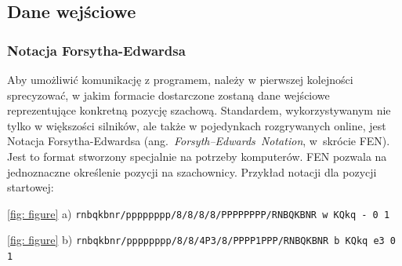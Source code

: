 \usepackage{biblatex}\subsection{Dane wejściowe}
\label{subsec:dane-wejsciowe}

\subsubsection{Notacja Forsytha-Edwardsa}

Aby umożliwić komunikację z programem, należy w pierwszej kolejności sprecyzować, w jakim formacie dostarczone zostaną dane wejściowe reprezentujące konkretną pozycję szachową.
Standardem, wykorzystywanym nie tylko w większości silników, ale także w pojedynkach rozgrywanych online, jest Notacja Forsytha-Edwardsa (ang.~\emph{Forsyth–Edwards~Notation}, w~skrócie FEN).
Jest to format stworzony specjalnie na potrzeby komputerów.
FEN pozwala na jednoznaczne określenie pozycji na szachownicy.
Przykład notacji dla pozycji startowej:

\vspace{5mm}
\centerline{
    \ref{fig: figure} a) \lstset{basicstyle=\ttfamily}\lstinline{rnbqkbnr/pppppppp/8/8/8/8/PPPPPPPP/RNBQKBNR w KQkq - 0 1}
}
\centerline{
    \ref{fig: figure} b) \lstset{basicstyle=\ttfamily}\lstinline{rnbqkbnr/pppppppp/8/8/4P3/8/PPPP1PPP/RNBQKBNR b KQkq e3 0 1}
}
\vspace{5mm}

